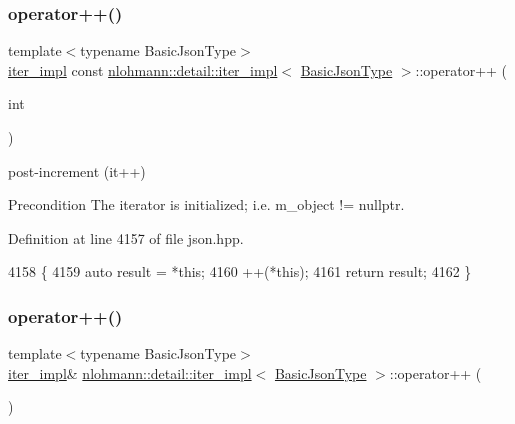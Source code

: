 \subsubsection{\texorpdfstring{operator++()}{operator++()}\hspace{0.1cm}{\footnotesize\ttfamily [1/2]}}
{\footnotesize\ttfamily template$<$typename Basic\+Json\+Type$>$ \\
\hyperlink{classnlohmann_1_1detail_1_1iter__impl}{iter\+\_\+impl} const \hyperlink{classnlohmann_1_1detail_1_1iter__impl}{nlohmann\+::detail\+::iter\+\_\+impl}$<$ \hyperlink{classnlohmann_1_1detail_1_1iter__impl_abf18f18793f84b0222aebb5a2a87da7a}{Basic\+Json\+Type} $>$\+::operator++ (\begin{DoxyParamCaption}\item[{int}]{ }\end{DoxyParamCaption})\hspace{0.3cm}{\ttfamily [inline]}}



post-\/increment (it++) 

\begin{DoxyPrecond}{Precondition}
The iterator is initialized; i.\+e. {\ttfamily m\+\_\+object != nullptr}. 
\end{DoxyPrecond}


Definition at line 4157 of file json.\+hpp.


\begin{DoxyCode}
4158     \{
4159         \textcolor{keyword}{auto} result = *\textcolor{keyword}{this};
4160         ++(*this);
4161         \textcolor{keywordflow}{return} result;
4162     \}
\end{DoxyCode}
\mbox{\label{classnlohmann_1_1detail_1_1iter__impl_abdfe2a7f464400a7ab572782d14b922f}} 
\subsubsection{\texorpdfstring{operator++()}{operator++()}\hspace{0.1cm}{\footnotesize\ttfamily [2/2]}}
{\footnotesize\ttfamily template$<$typename Basic\+Json\+Type$>$ \\
\hyperlink{classnlohmann_1_1detail_1_1iter__impl}{iter\+\_\+impl}\& \hyperlink{classnlohmann_1_1detail_1_1iter__impl}{nlohmann\+::detail\+::iter\+\_\+impl}$<$ \hyperlink{classnlohmann_1_1detail_1_1iter__impl_abf18f18793f84b0222aebb5a2a87da7a}{Basic\+Json\+Type} $>$\+::operator++ (\begin{DoxyParamCaption}{ }\end{DoxyParamCaption})\hspace{0.3cm}{\ttfamily [inline]}}



